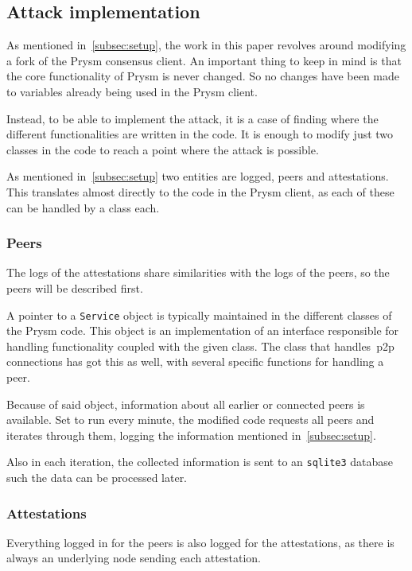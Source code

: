 \subsection{Attack implementation}\label{subsec:attack-implementation}
As mentioned in~\autoref{subsec:setup},
the work in this paper revolves around modifying a fork of the Prysm consensus client.
An important thing to keep in mind is that the core functionality of Prysm is never changed.
So no changes have been made to variables already being used in the Prysm client.

Instead, to be able to implement the attack,
it is a case of finding where the different functionalities are written in the code.
It is enough to modify just two classes in the code to reach a point where the attack is possible.

As mentioned in~\autoref{subsec:setup} two entities are logged, peers and attestations.
This translates almost directly to the code in the Prysm client, as each of these can be handled by a class each. 

\subsubsection{Peers}\label{subsubsec:peers}
The logs of the attestations share similarities with the logs of the peers, so the peers will be described first.

A pointer to a \texttt{Service} object is typically maintained in the different classes of the Prysm code.
This object is an implementation of an interface responsible for handling functionality coupled with the given class.
The class that handles~\gls{p2p} connections has got this as well, with several specific functions for handling a peer.

Because of said object, information about all earlier or connected peers is available.
Set to run every minute, the modified code requests all peers and iterates through them,
logging the information mentioned in~\autoref{subsec:setup}.


Also in each iteration,
the collected information is sent to an \texttt{sqlite3} database such the data can be processed later.

\subsubsection{Attestations}\label{subsubsec:attestations}
Everything logged in for the peers is also logged for the attestations,
as there is always an underlying node sending each attestation.

